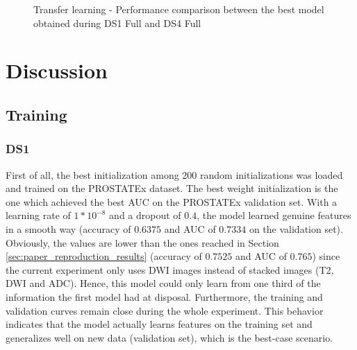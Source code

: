 \begin{figure}[!h]
\centering
\noindent
{}
\caption{Transfer learning - Performance comparison between the best model obtained during DS1 Full and DS4 Full}
\label{fig:tl_results_test_set}
\end{figure}



\section{Discussion}

\subsection{Training}

\subsubsection{DS1}
\setlength{\marginparwidth}{3cm}\leavevmode {}First of all, the best initialization among 200 random initializations was loaded and trained on the PROSTATEx dataset. The best weight initialization is the one which achieved the best AUC on the PROSTATEx validation set. With a learning rate of $1*10^{-8}$ and a dropout of $0.4$, the model learned genuine features in a smooth way (accuracy of $0.6375$ and AUC of $0.7334$ on the validation set). Obviously, the values are lower than the ones reached in Section \ref{sec:paper_reproduction_results} (accuracy of $0.7525$ and AUC of $0.765$) since the current experiment only uses DWI images instead of stacked images (T2, DWI and ADC). Hence, this model could only learn from one third of the information the first model had at disposal. Furthermore, the training and validation curves remain close during the whole experiment. This behavior indicates that the model actually learns features on the training set and generalizes well on new data (validation set), which is the best-case scenario.

